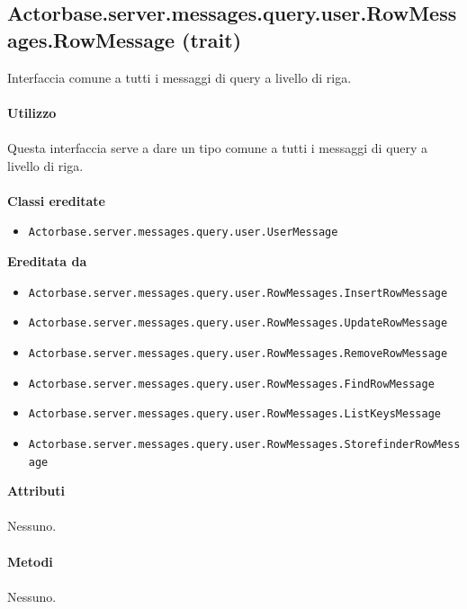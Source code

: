 \documentclass[a4paper]{article}
\begin{document}
	\subsection{Actorbase.server.messages.query.user.RowMessages.RowMessage (trait)}
			Interfaccia comune a tutti i messaggi di query a livello di riga.
			\\ \\
		\textbf{Utilizzo}
			\\ \\
			Questa interfaccia serve a dare un tipo comune a tutti i messaggi di query a livello di riga.
			\\ \\
		\textbf{Classi ereditate}
			\begin{itemize}
				\item \texttt{Actorbase.server.messages.query.user.UserMessage }
			\end{itemize}
		\textbf{Ereditata da}
			\begin{itemize}
				\item \texttt{Actorbase.server.messages.query.user.RowMessages.InsertRowMessage }
				\item \texttt{Actorbase.server.messages.query.user.RowMessages.UpdateRowMessage }
				\item \texttt{Actorbase.server.messages.query.user.RowMessages.RemoveRowMessage }
				\item \texttt{Actorbase.server.messages.query.user.RowMessages.FindRowMessage }
				\item \texttt{Actorbase.server.messages.query.user.RowMessages.ListKeysMessage }
				\item \texttt{Actorbase.server.messages.query.user.RowMessages.StorefinderRowMessage }
			\end{itemize}
		\textbf{Attributi}
			\\ \\
			Nessuno.
			\\ \\
		\textbf{Metodi}
			\\ \\
			Nessuno.	
			
\end{document}
